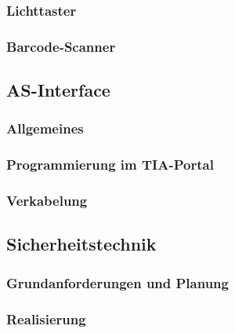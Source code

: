 \subsubsection{Lichttaster}

\subsubsection{Barcode-Scanner}

\subsection{AS-Interface}

\subsubsection{Allgemeines}

\subsubsection{Programmierung im TIA-Portal}

\subsubsection{Verkabelung}


\subsection{Sicherheitstechnik}
\subsubsection{Grundanforderungen und Planung}
\subsubsection{Realisierung}